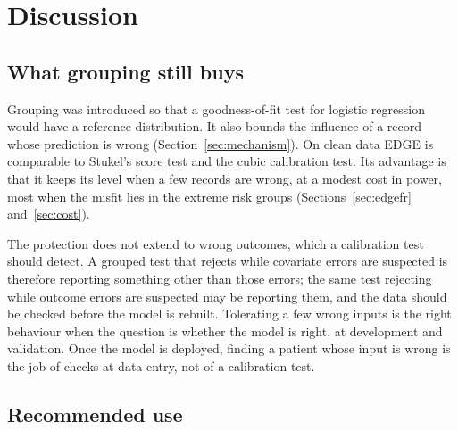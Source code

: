 \section{Discussion}\label{sec:discuss}

\subsection{What grouping still buys}\label{sec:asymmetry}

Grouping was introduced so that a goodness-of-fit test for logistic regression would have a reference
distribution. It also bounds the influence of a record whose prediction is wrong
(Section~\ref{sec:mechanism}). On clean data EDGE is comparable to Stukel's score test and the cubic
calibration test. Its advantage is that it keeps its level when a few records are wrong, at a modest
cost in power, most when the misfit lies in the extreme risk groups (Sections~\ref{sec:edgefr}
and~\ref{sec:cost}).

The protection does not extend to wrong outcomes, which a calibration test should detect. A grouped
test that rejects while covariate errors are suspected is therefore reporting something other than
those errors; the same test rejecting while outcome errors are suspected may be reporting them, and the
data should be checked before the model is rebuilt. Tolerating a few wrong inputs is the right
behaviour when the question is whether the model is right, at development and validation. Once the
model is deployed, finding a patient whose input is wrong is the job of checks at data entry, not of a
calibration test.

\subsection{Recommended use}\label{sec:whentouse}

